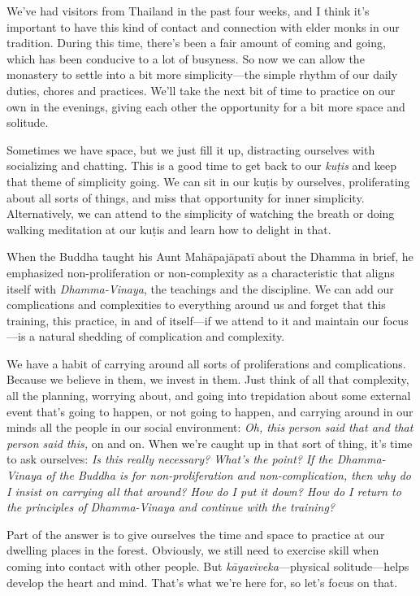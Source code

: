 
We've had visitors from Thailand in the past four weeks, and I think 
it's important to have this kind of contact and connection with elder 
monks in our tradition. During this time, there's been a fair amount of 
coming and going, which has been conducive to a lot of busyness. So now 
we can allow the monastery to settle into a bit more simplicity---the 
simple rhythm of our daily duties, chores and practices. We'll take the 
next bit of time to practice on our own in the evenings, giving each 
other the opportunity for a bit more space and solitude.

Sometimes we have space, but we just fill it up, distracting ourselves 
with socializing and chatting. This is a good time to get back to our 
\emph{kuṭis} and keep that theme of simplicity going. We can sit in 
our kuṭis by ourselves, proliferating about all sorts of things, and 
miss that opportunity for inner simplicity. Alternatively, we can 
attend to the simplicity of watching the breath or doing walking 
meditation at our kuṭis and learn how to delight in that.

When the Buddha taught his Aunt Mahāpajāpatī about the Dhamma in 
brief, he emphasized non-proliferation or non-complexity as a 
characteristic that aligns itself with \emph{Dhamma-Vinaya}, the 
teachings and the discipline. We can add our complications and 
complexities to everything around us and forget that this training, 
this practice, in and of itself---if we attend to it and maintain our 
focus---is a natural shedding of complication and complexity.

We have a habit of carrying around all sorts of proliferations and 
complications. Because we believe in them, we invest in them. Just 
think of all that complexity, all the planning, worrying about, and 
going into trepidation about some external event that's going to 
happen, or not going to happen, and carrying around in our minds all 
the people in our social environment: \emph{Oh, this person said that 
and that person said this,} on and on. When we're caught up in that 
sort of thing, it's time to ask ourselves: \emph{Is this really 
necessary? What's the point?} \emph{If the Dhamma-Vinaya of the Buddha 
is for non-proliferation and non-complication, then why do I insist on 
carrying all that around? How do I put it down? How do I return to the 
principles of Dhamma-Vinaya and continue with the training?}

Part of the answer is to give ourselves the time and space to practice 
at our dwelling places in the forest. Obviously, we still need to 
exercise skill when coming into contact with other people. But 
\emph{kāyaviveka}---physical solitude---helps develop the heart and 
mind. That's what we're here for, so let's focus on that.

